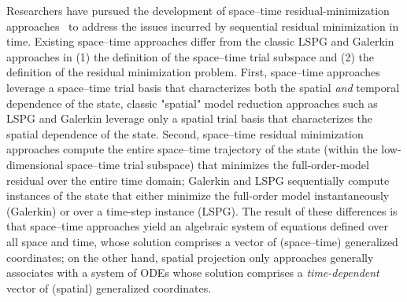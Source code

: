 \documentclass[3p,computermodern,10pt]{elsarticle}
\begin{document}
Researchers have pursued the development of space--time
residual-minimization approaches~\cite{choi_stlspg,constantine_strom,URBAN2012203,Yano2014ASC} to
address the issues incurred by sequential residual minimization in time.
Existing space--time approaches differ from the classic LSPG and Galerkin approaches in (1) the definition of the space--time trial subspace and (2) the definition of the residual minimization problem. 
First, space--time approaches leverage a space--time trial basis that characterizes both the spatial \textit{and} temporal dependence of the state, classic "spatial" model reduction approaches such as LSPG and Galerkin leverage only a spatial trial basis that characterizes the spatial dependence of the state. 
Second, space--time residual minimization approaches compute the entire space--time trajectory of the state (within the low-dimensional space--time trial subspace) that minimizes the full-order-model residual over the entire time domain; Galerkin and LSPG sequentially compute instances of the state that either minimize the full-order model instantaneously (Galerkin) or over a time-step instance (LSPG). 
The result of these differences is that space--time approaches yield an algebraic system of equations defined
over all space and time, whose solution comprises a  vector of
(space--time) generalized coordinates; on the other hand, spatial projection only approaches 
generally associates with a system of ODEs whose solution
comprises a \textit{time-dependent} vector of (spatial) generalized
coordinates.
\end{document}
